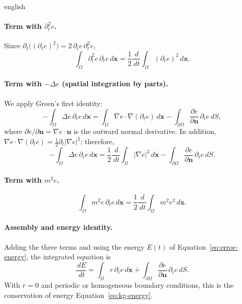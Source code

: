 \documentclass[12pt,letterpaper,twoside]{book}
\newcommand{\abs}[1]{\left\lvert #1 \right\rvert}
\begin{document}
\begin{hyphenrules}{english}
\paragraph{Term with $\partial_t^2e$.}
Since $\partial_t\big((\partial_te)^2\big)=2\,\partial_te\,\partial_t^2e$,
\[
  \int_\Omega\partial_t^2e\,\partial_te\,d\mathbf{x}=\frac12\frac{\,d}{\,d t}\int_\Omega(\partial_te)^2\,d\mathbf{x}.
\]

\paragraph{Term with $-\Delta e$ (spatial integration by parts).}
We apply Green's first identity:
\[
  -\int_\Omega\Delta e\,\partial_te\,d\mathbf{x}=\int_\Omega\nabla e\cdot\nabla(\partial_te)\,d\mathbf{x}
  -\int_{\partial\Omega}\frac{\partial e}{\partial\mathbf{n}}\,\partial_te\,d S,
\]
where $\partial e/\partial\mathbf{n}=\nabla e\cdot\mathbf{n}$ is the outward normal derivative. In addition,
$\nabla e\cdot\nabla(\partial_te)=\frac12\partial_t\abs{\nabla e}^2$; therefore,
\begin{equation}
  -\int_\Omega\Delta e\,\partial_te\,d\mathbf{x}=\frac12\frac{\,d}{\,d t}\int_\Omega\abs{\nabla e}^2\,d\mathbf{x}
  -\int_{\partial\Omega}\frac{\partial e}{\partial\mathbf{n}}\,\partial_te\,d S.
  \label{eq:app-lap}
\end{equation}

\paragraph{Term with $m^2e$.}
\[
  \int_\Omega m^2e\,\partial_te\,d\mathbf{x}=\frac12\frac{\,d}{\,d t}\int_\Omega m^2e^2\,d\mathbf{x}.
\]

\paragraph{Assembly and energy identity.}
Adding the three terms and using the energy $E(t)$ of Equation~\eqref{eq:error-energy}, the integrated equation is
\begin{equation}
  \frac{\,d E}{\,d t}=\int_\Omega r\,\partial_te\,d\mathbf{x}+\int_{\partial\Omega}\frac{\partial e}{\partial\mathbf{n}}\,\partial_te\,d S.
  \label{eq:app-identity}
\end{equation}
With $r=0$ and periodic or homogeneous boundary conditions, this is the conservation of energy
Equation~\eqref{eq:kg-energy}.


\end{hyphenrules}
\end{document}
